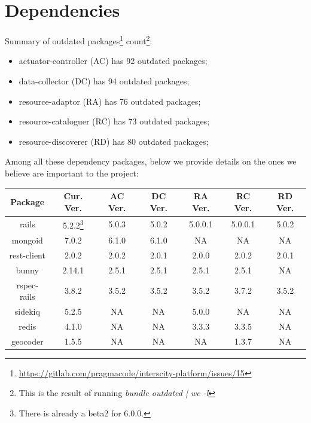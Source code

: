 \documentclass[paper=a4, fontsize=11pt]{scrartcl}
\numberwithin{equation}{section}    %
\numberwithin{figure}{section}      %
\numberwithin{table}{section}        %
\begin{document}
\section{Dependencies}
  Summary of outdated packages\footnote{\url{https://gitlab.com/pragmacode/interscity-platform/issues/15}} count\footnote{This is the result of running \textit{bundle outdated | wc -l}}:

  \begin{itemize}
    \item actuator-controller (AC) has 92 outdated packages;
    \item data-collector (DC) has 94 outdated packages;
    \item resource-adaptor (RA) has 76 outdated packages;
    \item resource-cataloguer (RC) has 73 outdated packages;
    \item resource-discoverer (RD) has 80 outdated packages;
  \end{itemize}

  Among all these dependency packages, below we provide details on the ones we believe are important to the project:

  \vspace{1em}

  \begin{center}
    \begin{tabu} to \textwidth {  c | c | c | c | c | c | c }
      \textbf{Package} & \textbf{Cur. Ver.} & \textbf{AC Ver.} & \textbf{DC Ver.} & \textbf{RA Ver.} & \textbf{RC Ver.} & \textbf{RD Ver.} \\ \hline \hline
      rails & 5.2.2\footnote{There is already a beta2 for 6.0.0.} & 5.0.3 & 5.0.2 & 5.0.0.1 & 5.0.0.1 & 5.0.2 \\ \hline
      mongoid & 7.0.2 & 6.1.0 & 6.1.0 & NA & NA & NA \\ \hline
      rest-client & 2.0.2 & 2.0.2 & 2.0.1 & 2.0.0 & 2.0.2 & 2.0.1 \\ \hline
      bunny & 2.14.1 & 2.5.1 & 2.5.1 & 2.5.1 & 2.5.1 & NA \\ \hline
      rspec-rails & 3.8.2 & 3.5.2 & 3.5.2 & 3.5.2 & 3.7.2 & 3.5.2 \\ \hline
      sidekiq & 5.2.5 & NA & NA & 5.0.0 & NA & NA \\ \hline
      redis & 4.1.0 & NA & NA & 3.3.3 & 3.3.5 & NA \\ \hline
      geocoder & 1.5.5 & NA & NA & NA & 1.3.7 & NA \\
    \end{tabu}
  \end{center}
\end{document}
